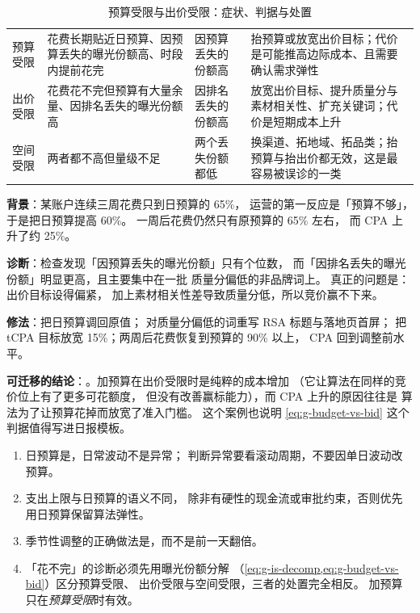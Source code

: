 \begin{table}[htbp]
\centering
\caption{预算受限与出价受限：症状、判据与处置}
\label{tab:g-budget-diag}
\small
\begin{tabularx}{\textwidth}{L{2.2cm} L{3.2cm} L{3.0cm} Y}
\toprule
{} &  &  &  \\
\midrule
预算受限 & 花费长期贴近日预算、因预算丢失的曝光份额高、时段内提前花完 & 因预算丢失的份额高 & 抬预算或放宽出价目标；代价是可能推高边际成本、且需要确认需求弹性 \\
\addlinespace
出价受限 & 花费花不完但预算有大量余量、因排名丢失的曝光份额高 & 因排名丢失的份额高 & 放宽出价目标、提升质量分与素材相关性、扩充关键词；代价是短期成本上升 \\
\addlinespace
空间受限 & 两者都不高但量级不足 & 两个丢失份额都低 & 换渠道、拓地域、拓品类；抬预算与抬出价都无效，这是最容易被误诊的一类 \\
\bottomrule
\end{tabularx}
\end{table}

\begin{casebox}
\textbf{背景}：某账户连续三周花费只到日预算的 65\%，
运营的第一反应是「预算不够」，于是把日预算提高 60\%。
一周后花费仍然只有原预算的 65\% 左右，
而 CPA 上升了约 25\%。

\textbf{诊断}：检查发现「因预算丢失的曝光份额」只有个位数，
而「因排名丢失的曝光份额」明显更高，且主要集中在一批
质量分偏低的非品牌词上。
真正的问题是：出价目标设得偏紧，
加上素材相关性差导致质量分低，所以竞价赢不下来。

\textbf{修法}：把日预算调回原值；
对质量分偏低的词重写 RSA 标题与落地页首屏；
把 tCPA 目标放宽 15\%；两周后花费恢复到预算的 90\% 以上，
CPA 回到调整前水平。

\textbf{可迁移的结论}：。加预算在出价受限时是纯粹的成本增加
（它让算法在同样的竞价位上有了更多可花额度，
但没有改善赢标能力），而 CPA 上升的原因往往是
算法为了让预算花掉而放宽了准入门槛。
这个案例也说明 \cref{eq:g-budget-vs-bid} 这个判据值得写进日报模板。
\end{casebox}

\begin{keypoint}[预算与节奏的四条原则]
\begin{enumerate}
  \item 日预算是，日常波动不是异常；
        判断异常要看滚动周期，不要因单日波动改预算。
  \item 支出上限与日预算的语义不同，
        除非有硬性的现金流或审批约束，否则优先用日预算保留算法弹性。
  \item 季节性调整的正确做法是，而不是前一天翻倍。
  \item 「花不完」的诊断必须先用曝光份额分解
        （\cref{eq:g-is-decomp,eq:g-budget-vs-bid}）区分预算受限、
        出价受限与空间受限，三者的处置完全相反。
        加预算只在\emph{预算受限}时有效。
\end{enumerate}
\end{keypoint}


